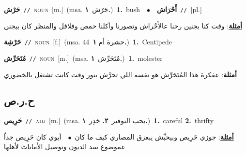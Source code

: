 \documentclass[10pt,a4paper,twoside]{article} %
\begin{document}
\begin{multicols}{2}
{\setlength\topsep{0pt}\textbf{\foreignlanguage{arabic}{حَرْش}}\ {\color{gray}\texttt{//}\color{black}}\ \textsc{noun}\ [m.]\ \color{gray}(msa. \foreignlanguage{arabic}{حَرْش}~\foreignlanguage{arabic}{\textbf{١.}})\color{black}\ \textbf{1.}~bush\ \ $\bullet$\ \ \setlength\topsep{0pt}\textbf{\foreignlanguage{arabic}{أَحْرَاش}}\ {\color{gray}\texttt{//}\color{black}}\ [pl.]\  \begin{flushright}\color{gray}\foreignlanguage{arabic}{\textbf{\underline{\foreignlanguage{arabic}{أمثلة}}}: وقت كنا بجنين رحنا عالأَحْراش وتصورنا وأكلنا حمص وفلافل والمنظر كان بيجنن}\end{flushright}\color{black}} \vspace{2mm}

{\setlength\topsep{0pt}\textbf{\foreignlanguage{arabic}{حَرْشِة}}\ {\color{gray}\texttt{//}\color{black}}\ \textsc{noun}\ [f.]\ \color{gray}(msa. \foreignlanguage{arabic}{حشرة أم 44}~\foreignlanguage{arabic}{\textbf{١.}})\color{black}\ \textbf{1.}~Centipede\ } \vspace{2mm}

{\setlength\topsep{0pt}\textbf{\foreignlanguage{arabic}{مُتَحَرِّش}}\ {\color{gray}\texttt{//}\color{black}}\ \textsc{noun}\ [m.]\ \color{gray}(msa. \foreignlanguage{arabic}{مُتَحَرِّش}~\foreignlanguage{arabic}{\textbf{١.}})\color{black}\ \textbf{1.}~molester\  \begin{flushright}\color{gray}\foreignlanguage{arabic}{\textbf{\underline{\foreignlanguage{arabic}{أمثلة}}}: عفكرة هذا المُتَحَرِّش هو نفسه اللي تحرَّش بنور وقت كانت تشتغل بالخضوري}\end{flushright}\color{black}} \vspace{2mm}

\vspace{-3mm}
\subsection*{\color{blue}\foreignlanguage{arabic}{ح.ر.ص}\color{blue}{}} 

{\setlength\topsep{0pt}\textbf{\foreignlanguage{arabic}{حَرِيص}}\ {\color{gray}\texttt{//}\color{black}}\ \textsc{adj}\ [m.]\ \color{gray}(msa. \foreignlanguage{arabic}{يحب التوفير}~\foreignlanguage{arabic}{\textbf{٢.}}  \foreignlanguage{arabic}{حَذِر}~\foreignlanguage{arabic}{\textbf{١.}})\color{black}\ \textbf{1.}~careful  \textbf{2.}~thrifty\  \begin{flushright}\color{gray}\foreignlanguage{arabic}{\textbf{\underline{\foreignlanguage{arabic}{أمثلة}}}: جوزي حَرِيص وبيحبِّش يبعزق المصاري كيف ما كان\ $\bullet$\ \  أبوي كان حَرِيص جداً عموضوع سد الديون وتوصيل الأمانات لأهلها}\end{flushright}\color{black}} \vspace{2mm}


\end{multicols}
\end{document}
